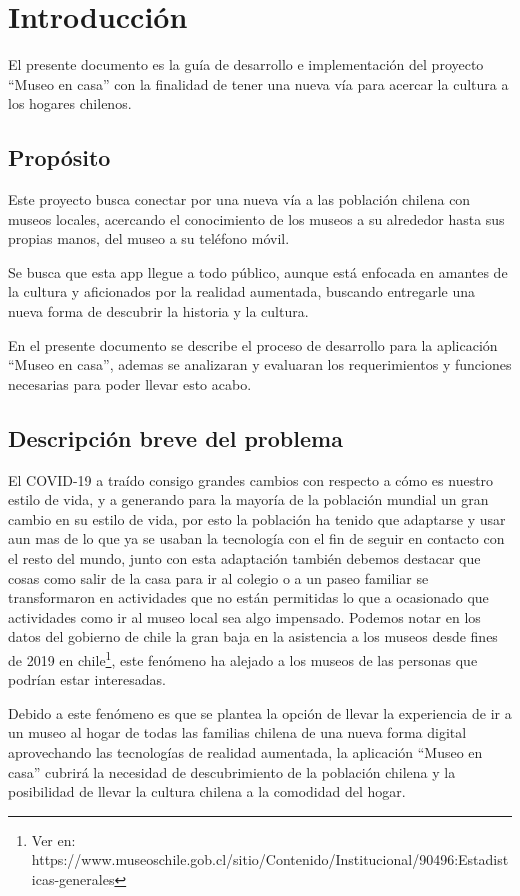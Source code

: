 \section{Introducción}
El presente documento es la guía de desarrollo e implementación del proyecto ``Museo en casa'' con la finalidad de tener una nueva vía para acercar la cultura a los hogares chilenos.

\subsection{Propósito}
Este proyecto busca conectar por una nueva vía a las población chilena con museos locales, acercando el conocimiento de los museos a su alrededor hasta sus propias manos, del museo a su teléfono móvil.

Se busca que esta app llegue a todo público, aunque está enfocada en amantes de la cultura y aficionados por la realidad aumentada, buscando entregarle una nueva forma de descubrir la historia y la cultura.

En el presente documento se describe el proceso de desarrollo para la aplicación ``Museo en casa'', ademas se analizaran y evaluaran los requerimientos y funciones necesarias para poder llevar esto acabo.

\subsection{Descripción breve del problema}
El COVID-19 a traído consigo grandes cambios con respecto a cómo es nuestro estilo de vida, y a generando para la mayoría de la población mundial un gran cambio en su estilo de vida, por esto la población ha tenido que adaptarse y usar aun mas de lo que ya se usaban la tecnología con el fin de seguir en contacto con el resto del mundo,  junto con esta adaptación también debemos destacar que cosas como salir de la casa para ir al colegio o a un paseo familiar se transformaron en actividades que no están permitidas lo que a ocasionado que actividades como ir al museo local sea algo impensado. Podemos notar en los datos del gobierno de chile la gran baja en la asistencia a los museos desde fines de 2019 en chile\footnote{Ver en: https://www.museoschile.gob.cl/sitio/Contenido/Institucional/90496:Estadisticas-generales}, este fenómeno ha alejado a los museos de las personas que podrían estar interesadas.

Debido a este fenómeno es que se plantea la opción de llevar la experiencia de ir a un museo al hogar de todas las familias chilena de una nueva forma digital aprovechando las tecnologías de realidad aumentada, la aplicación ``Museo en casa'' cubrirá la necesidad de descubrimiento de la población chilena y la posibilidad de llevar la cultura chilena a la comodidad del hogar.  
